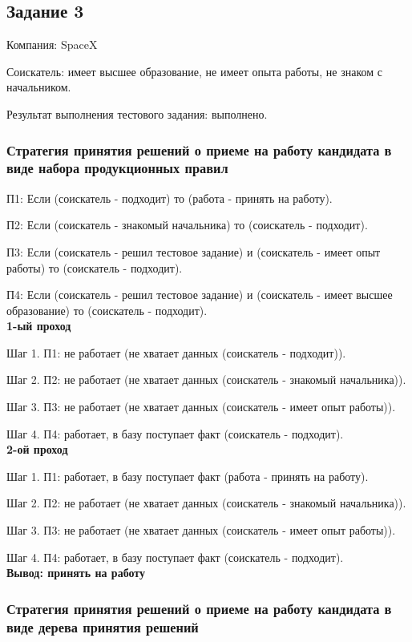 \documentclass[14pt,a4paper,report]{report}
\begin{document}
\subsection{Задание 3}

Компания: SpaceX

Соискатель: имеет высшее образование, не имеет опыта работы, не знаком с начальником.

Результат выполнения тестового задания: выполнено.

\subsubsection{Стратегия принятия решений о приеме на работу кандидата в виде набора продукционных правил}

П1: Если (соискатель - подходит) то (работа - принять на работу).

П2: Если (соискатель - знакомый начальника) то (соискатель - подходит).

П3: Если (соискатель - решил тестовое задание) и (соискатель - имеет опыт работы) то (соискатель - подходит).

П4: Если (соискатель - решил тестовое задание) и (соискатель - имеет высшее образование) то (соискатель - подходит).\\

\textbf{1-ый проход}

Шаг 1. П1: не работает (не хватает данных (соискатель - подходит)).

Шаг 2. П2: не работает (не хватает данных (соискатель - знакомый начальника)).

Шаг 3. П3: не работает (не хватает данных (соискатель - имеет опыт работы)).

Шаг 4. П4: работает, в базу поступает факт (соискатель - подходит).\\

\textbf{2-ой проход}

Шаг 1. П1: работает, в базу поступает факт (работа - принять на работу).

Шаг 2. П2: не работает (не хватает данных (соискатель - знакомый начальника)).

Шаг 3. П3: не работает (не хватает данных (соискатель - имеет опыт работы)).

Шаг 4. П4: работает, в базу поступает факт (соискатель - подходит).\\

\textbf{Вывод: принять на работу}

\subsubsection{Стратегия принятия решений о приеме на работу кандидата в виде дерева принятия решений}
\end{document}
